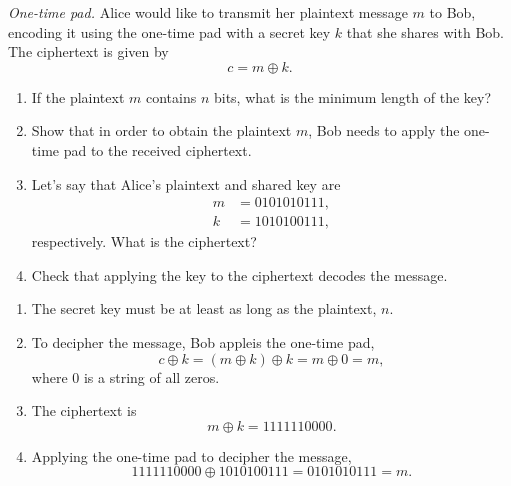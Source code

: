 \begin{exercise}
\emph{One-time pad.} Alice would like to transmit her plaintext message $m$ to Bob, encoding it using the one-time pad with a secret key $k$ that she shares with Bob. The ciphertext is given by
\begin{equation}
    c = m \oplus k.
\end{equation}
\begin{enumerate}[label=(\alph*)]
    \item If the plaintext $m$ contains $n$ bits, what is the minimum length of the key?
    \item Show that in order to obtain the plaintext $m$, Bob needs to apply the one-time pad to the received ciphertext.
    \item Let's say that Alice's plaintext and shared key are
    \begin{align*}
        m & = 0101010111, \\
        k & = 1010100111,
    \end{align*}
    respectively. What is the ciphertext?
    \item Check that applying the key to the ciphertext decodes the message.
\end{enumerate}
\end{exercise}
\begin{solution}
\begin{enumerate}[label=(\alph*)]
    \item The secret key must be at least as long as the plaintext, $n$.
    \item To decipher the message, Bob appleis the one-time pad,
    \begin{equation*}
        c \oplus k = \left( m \oplus k \right) \oplus k = m \oplus 0 = m,
    \end{equation*}
    where $0$ is a string of all zeros.
    \item The ciphertext is
    \begin{equation*}
        m \oplus k = 1111110000.
    \end{equation*}
    \item Applying the one-time pad to decipher the message,
    \begin{equation*}
        1111110000 \oplus 1010100111 = 0101010111 = m.
    \end{equation*}
\end{enumerate}
\end{solution}

